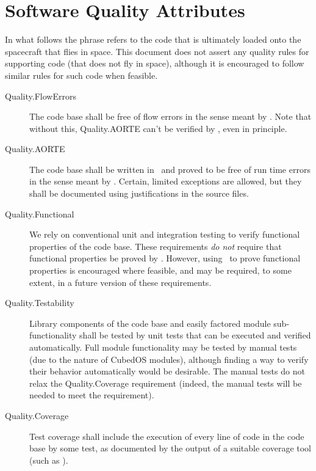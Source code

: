 
\section{Software Quality Attributes}

In what follows the phrase  refers to the code that is ultimately loaded onto the spacecraft that flies in space. This document does not assert any quality rules for supporting code (that does not fly in space), although it is encouraged to follow similar rules for such code when feasible.

\begin{description}
\item[Quality.FlowErrors] The code base shall be free of flow errors in the sense meant by \SPARK. Note that without this, Quality.AORTE can't be verified by \SPARK, even in principle.

\item[Quality.AORTE] The code base shall be written in \SPARK\ and proved to be free of run time errors in the sense meant by \SPARK. Certain, limited exceptions are allowed, but they shall be documented using justifications in the source files.

\item[Quality.Functional] We rely on conventional unit and integration testing to verify functional properties of the code base. These requirements \emph{do not} require that functional properties be proved by \SPARK. However, using \SPARK\ to prove functional properties is encouraged where feasible, and may be required, to some extent, in a future version of these requirements.

\item[Quality.Testability] Library components of the code base and easily factored module sub-functionality shall be tested by unit tests that can be executed and verified automatically. Full module functionality may be tested by manual tests (due to the nature of CubedOS modules), although finding a way to verify their behavior automatically would be desirable. The manual tests do not relax the Quality.Coverage requirement (indeed, the manual tests will be needed to meet the requirement).

\item[Quality.Coverage] Test coverage shall include the execution of every line of code in the code base by some test, as documented by the output of a suitable coverage tool (such as ).


\end{description}
